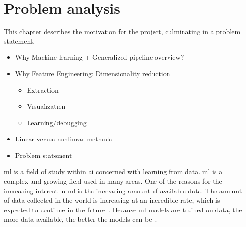 \chapter{Problem analysis}\label{cha:problem-analysis}
This chapter describes the motivation for the project, culminating in a problem statement.

\begin{itemize}
    \item Why Machine learning + Generalized pipeline overview?
    \item Why Feature Engineering: Dimensionality reduction
          \begin{itemize}
              \item Extraction
              \item Visualization
              \item Learning/debugging
          \end{itemize}
    \item Linear versus nonlinear methods
    \item Problem statement
\end{itemize}

\gls{ml} is a field of study within \gls{ai} concerned with learning from data. \gls{ml} is a complex and growing field used in many areas. One of the reasons for the increasing interest in \gls{ml} is the increasing amount of available data. The amount of data collected in the world is increasing at an incredible rate, which is expected to continue in the future~\cite{data-never-sleeps}. Because \gls{ml} models are trained on data, the more data available, the better the models can be~\cite{Unreasonable-effectiveness-of-data-Norvig}.

